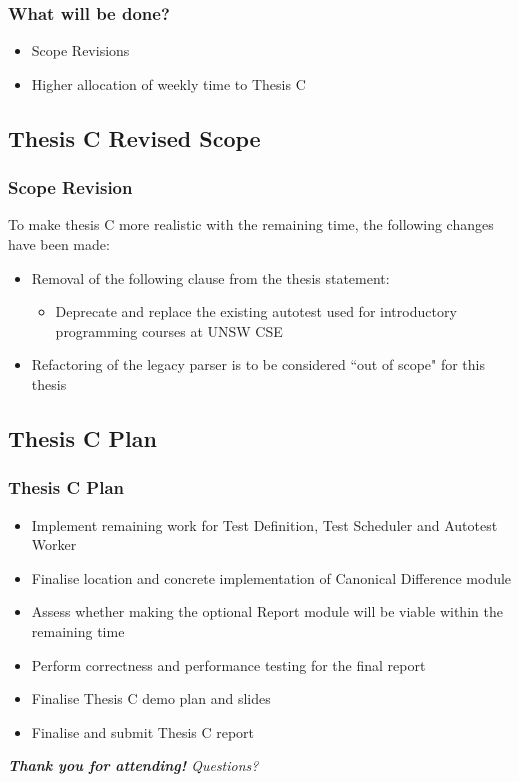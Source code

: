 \documentclass[xcolor]{beamer}
\begin{document}
\begin{frame}
	\frametitle{What will be done?}
	\begin{itemize}
		\item Scope Revisions
		\pause
		\item Higher allocation of weekly time to Thesis C
	\end{itemize}
\end{frame}

\subsection{Thesis C Revised Scope}
\begin{frame}
	\frametitle{Scope Revision}
	To make thesis C more realistic with the remaining time, the following changes have been made:
	\begin{itemize}
		\item Removal of the following clause from the thesis statement:
		\begin{itemize}
			\item Deprecate and replace the existing autotest used for introductory programming courses at UNSW CSE
		\end{itemize}
		\pause
		\item Refactoring of the legacy parser is to be considered ``out of scope" for this thesis
	\end{itemize}
	
\end{frame}

\subsection{Thesis C Plan}
\begin{frame}
	\frametitle{Thesis C Plan}
	\begin{itemize}
		\item Implement remaining work for Test Definition, Test Scheduler and Autotest Worker
		\pause
		\item Finalise location and concrete implementation of Canonical Difference module
		\pause
		\item Assess whether making the optional Report module will be viable within the remaining time
		\pause
		\item Perform correctness and performance testing for the final report
		\pause
		\item Finalise Thesis C demo plan and slides
		\pause
		\item Finalise and submit Thesis C report
		\pause
	\end{itemize}
	\textit{\textbf{Thank you for attending!} Questions?}
\end{frame}
\end{document}
